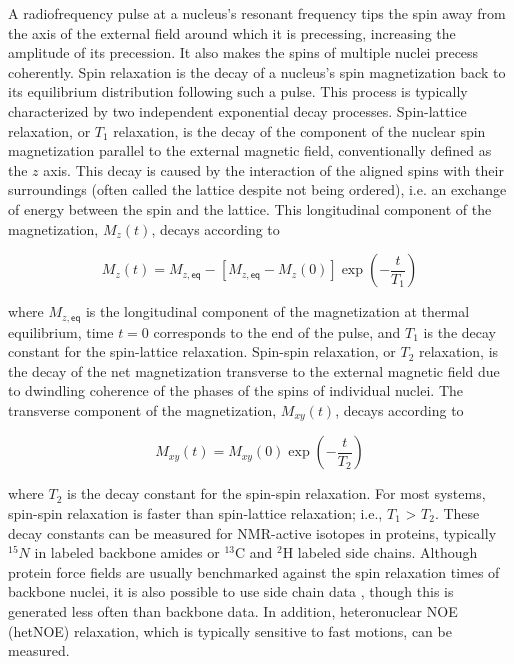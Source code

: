 \documentclass[9pt,review]{livecoms}
\begin{document}
A radiofrequency pulse at a nucleus’s resonant frequency tips the spin away from the axis of the external field around which it is precessing, increasing the amplitude of its precession.
It also makes the spins of multiple nuclei precess coherently.
Spin relaxation is the decay of a nucleus’s spin magnetization back to its equilibrium distribution following such a pulse.
This process is typically characterized by two independent exponential decay processes.
Spin-lattice relaxation, or $T_1$ relaxation, is the decay of the component of the nuclear spin magnetization parallel to the external magnetic field, conventionally defined as the $z$ axis.
This decay is caused by the interaction of the aligned spins with their surroundings (often called the lattice despite not being ordered), i.e. an exchange of energy between the spin and the lattice.
This longitudinal component of the magnetization, $M_z(t)$, decays according to

\begin{equation}
\label{eqn:t1_relax}
M_z(t) = M_{z,\mathsf{eq}} - [M_{z,\mathsf{eq}} - M_z(0)] \exp \left( -\frac {t} {T_1} \right)
\end{equation}

\noindent where $M_{z,\mathsf{eq}}$ is the longitudinal component of the magnetization at thermal equilibrium, time $t = 0$ corresponds to the end of the pulse, and $T_1$ is the decay constant for the spin-lattice relaxation.
Spin-spin relaxation, or $T_2$ relaxation, is the decay of the net magnetization transverse to the external magnetic field due to dwindling coherence of the phases of the spins of individual nuclei. The transverse component of the magnetization, $M_{xy}(t)$, decays according to

\begin{equation}
\label{eqn:t2_relax}
M_{xy}(t) = M_{xy}(0) \exp \left( -\frac {t} {T_2} \right)
\end{equation}

\noindent where $T_2$ is the decay constant for the spin-spin relaxation.
For most systems, spin-spin relaxation is faster than spin-lattice relaxation; i.e., $T_1$ > $T_2$.
These decay constants can be measured for NMR-active isotopes in proteins, typically $^{15}N$ in labeled backbone amides or $^{13}$C and $^2$H labeled side chains.
Although protein force fields are usually benchmarked against the spin relaxation times of backbone nuclei, it is also possible to use side chain data \cite{hoffmann_accurate_2018}, though this is generated less often than backbone data.
In addition, heteronuclear NOE (hetNOE) relaxation, which is typically sensitive to fast motions, can be measured.
\end{document}
